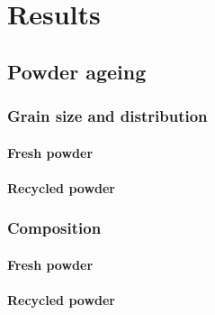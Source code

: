 \chapter{Results}
\label{Chap4}
\section{Powder ageing}

\subsection{Grain size and distribution}
\subsubsection{Fresh powder}

\subsubsection{Recycled powder}
\subsection{Composition}

\subsubsection{Fresh powder}

\subsubsection{Recycled powder}
 \begin{center}
\begin{table}[ht]
\noindent{}

\caption[Composition of recycled AlSi10Mg powder as a function of the date]{Composition of recycled AlSi10Mg powder as a function of the date}
\label{tab:compo}
\end{table}
 \end{center}

